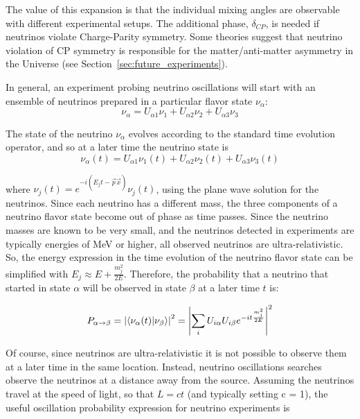 The value of this expansion is that the individual mixing angles are observable with different experimental setups.  The additional phase, $\delta_{CP}$, is needed if neutrinos violate Charge-Parity symmetry.  Some theories suggest that neutrino violation of CP symmetry is responsible for the matter/anti-matter asymmetry in the Universe (see Section~\ref{sec:future_experiments}).

In general, an experiment probing neutrino oscillations will start with an ensemble of neutrinos prepared in a particular flavor state $\nu_\alpha$:
\begin{equation*}
\nu_\alpha = U_{\alpha 1} \nu_1 + U_{\alpha 2} \nu_2 + U_{\alpha 3} \nu_3
\end{equation*}

The state of the neutrino $\nu_\alpha$ evolves according to the standard time evolution operator, and so at a later time the neutrino state is  
\begin{equation*}
\nu_\alpha (t) = U_{\alpha 1} \nu_1(t) + U_{\alpha 2} \nu_2(t) + U_{\alpha 3} \nu_3(t)
\end{equation*}

where $\nu_{j}(t) = e^{-i ( E_j t - \vec{p} \dot \vec{x})} \nu_j (t)$, using the plane wave solution for the neutrinos.  Since each neutrino has a different mass, the three components of a neutrino flavor state become out of phase as time passes.  Since the neutrino masses are known to be very small, and the neutrinos detected in experiments are typically energies of MeV or higher, all observed neutrinos are ultra-relativistic.  So, the energy expression in the time evolution of the neutrino flavor state can be simplified with $E_j \approx E + \frac{m_j^2}{2E}$.  Therefore, the probability that a neutrino that started in state $\alpha$ will be observed in state $\beta$ at a later time $t$ is:

\begin{equation*}
P_{\alpha\rightarrow\beta} = \left|\braket{\nu_\alpha(t) | \nu_\beta}\right|^2 = \left|\sum_i U_{i\alpha} U_{i\beta} e^{-i t \frac{m_j^2 }{ 2 E}}\right|^2
\end{equation*}

Of course, since neutrinos are ultra-relativistic it is not possible to observe them at a later time in the same location.  Instead, neutrino oscillations searches observe the neutrinos at a distance away from the source.  Assuming the neutrinos travel at the speed of light, so that $L = c t$ (and typically setting c = 1), the useful oscillation probability expression for neutrino experiments is 

